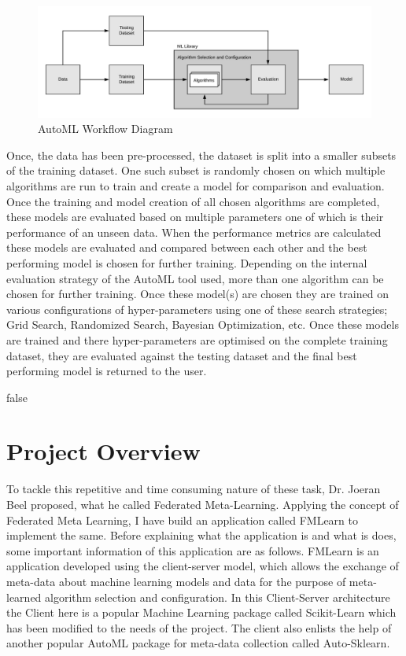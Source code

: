 \begin{figure}[t]
    \centering
    \includegraphics[width=16cm]{images/ML Workflow.jpeg}
    \caption{AutoML Workflow Diagram}
    \label{automl-workflow-diagram}
\end{figure}

Once, the data has been pre-processed, the dataset is split into a smaller subsets of the training dataset. One such subset is randomly chosen on which multiple algorithms are run to train and create a model for comparison and evaluation. Once the training and model creation of all chosen algorithms are completed, these models are evaluated based on multiple parameters one of which is their performance of an unseen data. When the performance metrics are calculated these models are evaluated and compared between each other and the best performing model is chosen for further training. Depending on the internal evaluation strategy of the AutoML tool used, more than one algorithm can be chosen for further training. Once these model(s) are chosen they are trained on various configurations of hyper-parameters using one of these search strategies; Grid Search, Randomized Search, Bayesian Optimization, etc. Once these models are trained and there hyper-parameters are optimised on the complete training dataset, they are evaluated against the testing dataset and the final best performing model is returned to the user.

\if false

\section{Project Overview}
To tackle this repetitive and time consuming nature of these task, Dr. Joeran Beel proposed, what he called Federated Meta-Learning. Applying the concept of Federated Meta Learning, I have build an application called FMLearn to implement the same. Before explaining what the application is and what is does, some important information of this application are as follows. FMLearn is an application developed using the client-server model, which allows the exchange of meta-data about machine learning models and data for the purpose of meta-learned algorithm selection and configuration. In this Client-Server architecture the Client here is a popular Machine Learning package called Scikit-Learn which has been modified to the needs of the project. The client also enlists the help of another popular AutoML package for meta-data collection called Auto-Sklearn. 

